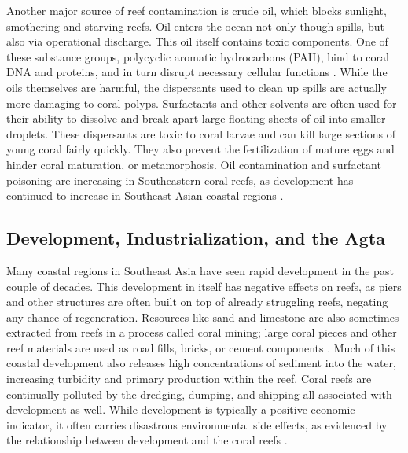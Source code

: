 \documentclass{book}\usepackage{knitr}
\begin{document}
\begin{knitrout}
\begin{kframe}
Another major source of reef contamination is crude oil, which blocks sunlight, smothering and starving reefs. Oil enters the ocean not only though spills, but also via operational discharge. This oil itself contains toxic components. One of these substance groups, polycyclic aromatic hydrocarbons (PAH), bind to coral DNA and proteins, and in turn disrupt necessary cellular functions \citep{4884777420100401}. While the oils themselves are harmful, the dispersants used to clean up spills are actually more damaging to coral polyps. Surfactants and other solvents are often used for their ability to dissolve and break apart large floating sheets of oil into smaller droplets. These dispersants are toxic to coral larvae and can kill large sections of young coral fairly quickly. They also prevent the fertilization of mature eggs and hinder coral maturation, or metamorphosis. Oil contamination and surfactant poisoning are increasing in Southeastern coral reefs, as development has continued to increase in Southeast Asian coastal regions \citep{2615280620070801}.

\subsection{Development, Industrialization, and the Agta}

Many coastal regions in Southeast Asia have seen rapid development in the past couple of decades. This development in itself has negative effects on reefs, as piers and other structures are often built on top of already struggling reefs, negating any chance of regeneration. Resources like sand and limestone are also sometimes extracted from reefs in a process called coral mining; large coral pieces and other reef materials are used as road fills, bricks, or cement components \citep{coralreefalliance_2021}. Much of this coastal development also releases high concentrations of sediment into the water, increasing turbidity and primary production within the reef. Coral reefs are continually polluted by the dredging, dumping, and shipping all associated with development as well. While development is typically a positive economic indicator, it often carries disastrous environmental side effects, as evidenced by the relationship between development and the coral reefs \citep{USEPA_2017}.


\end{kframe}
\end{knitrout}
\end{document}
